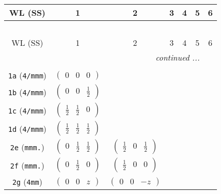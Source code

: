\documentclass[fleqn,9pt,landscape]{jsarticle}
\begin{document}
\begin{center}
\renewcommand{\arraystretch}{1.2}
\begin{longtable}{ccccccc}
 \hline \hline
WL (SS) & 1 & 2 & 3 & 4 & 5 & 6 \\ \hline \endfirsthead

\multicolumn{6}{l}{\tablename\ \thetable{}} \\
 \hline \hline
WL (SS) & 1 & 2 & 3 & 4 & 5 & 6 \\ \hline \endhead

 \hline \hline
\multicolumn{6}{r}{\footnotesize\it continued ...} \\ \endfoot

 \hline \hline
\multicolumn{6}{r}{} \\ \endlastfoot

{\tt 1a} ({\tt 4/mmm}) & $ \begin{pmatrix} 0 & 0 & 0 \end{pmatrix} $ & $  $ & $  $ & $  $ & $  $ & $  $ \\ \hline
{\tt 1b} ({\tt 4/mmm}) & $ \begin{pmatrix} 0 & 0 & \frac{1}{2} \end{pmatrix} $ & $  $ & $  $ & $  $ & $  $ & $  $ \\ \hline
{\tt 1c} ({\tt 4/mmm}) & $ \begin{pmatrix} \frac{1}{2} & \frac{1}{2} & 0 \end{pmatrix} $ & $  $ & $  $ & $  $ & $  $ & $  $ \\ \hline
{\tt 1d} ({\tt 4/mmm}) & $ \begin{pmatrix} \frac{1}{2} & \frac{1}{2} & \frac{1}{2} \end{pmatrix} $ & $  $ & $  $ & $  $ & $  $ & $  $ \\ \hline
{\tt 2e} ({\tt mmm.}) & $ \begin{pmatrix} 0 & \frac{1}{2} & \frac{1}{2} \end{pmatrix} $ & $ \begin{pmatrix} \frac{1}{2} & 0 & \frac{1}{2} \end{pmatrix} $ & $  $ & $  $ & $  $ & $  $ \\ \hline
{\tt 2f} ({\tt mmm.}) & $ \begin{pmatrix} 0 & \frac{1}{2} & 0 \end{pmatrix} $ & $ \begin{pmatrix} \frac{1}{2} & 0 & 0 \end{pmatrix} $ & $  $ & $  $ & $  $ & $  $ \\ \hline
{\tt 2g} ({\tt 4mm}) & $ \begin{pmatrix} 0 & 0 & z \end{pmatrix} $ & $ \begin{pmatrix} 0 & 0 & - z \end{pmatrix} $ & $  $ & $  $ & $  $ & $  $ \\ \hline

\end{longtable}
\end{center}
\end{document}
